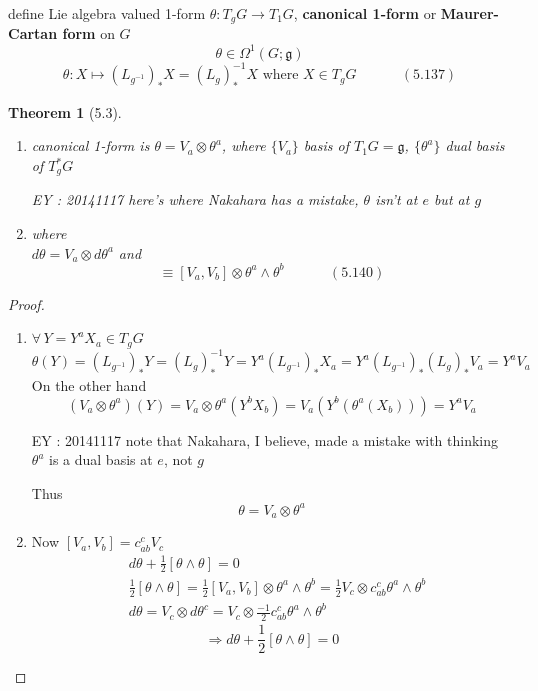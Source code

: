 \documentclass[twoside]{amsart}
\newtheorem{theorem}{Theorem}
\begin{document}
define Lie algebra valued 1-form $\theta: T_gG \to T_1G$, \textbf{canonical 1-form} or \textbf{Maurer-Cartan form} on $G$ \\
\[
\theta \in \Omega^1(G;\mathfrak{g})
\]
\begin{equation}
  \theta : X \mapsto (L_{g^{-1}})_* X = (L_g)^{-1}_* X \text{ where } X \in T_gG \quad \quad \quad \, (5.137)
\end{equation}

\begin{theorem}[5.3] 
\begin{enumerate}
\item[(a)] canonical 1-form is $\theta = V_a \otimes \theta^a$, where $\lbrace V_a \rbrace$ basis of $T_1G = \mathfrak{g}$, $\lbrace \theta^a \rbrace$ dual basis of $T^*_gG$

EY : 20141117 here's where Nakahara has a mistake, $\theta$ isn't at $e$ but at $g$
\item[(b)] where \\
$d\theta = V_a\otimes d\theta^a$ and 
\begin{equation}
  [ \theta \wedge \theta ] \equiv [ V_{a} , V_{b} ] \otimes \theta^{a} \wedge \theta^{b} \quad \quad \quad \, (5.140)
\end{equation}
\end{enumerate}
\end{theorem}

\begin{proof}
  \begin{enumerate}
\item[(a)] $\forall \, Y = Y^a X_a \in T_gG$
\[
\theta(Y) = (L_{g^{-1}})_* Y = (L_g)^{-1}_* Y = Y^a(L_{g^{-1}})_* X_a = Y^a (L_{g^{-1}})_* (L_g)_* V_a = Y^a V_a
\]
On the other hand
\[
(V_a \otimes \theta^a)(Y) = V_a \otimes \theta^a(Y^b X_b) = V_a (Y^b(\theta^a(X_b))) = Y^a V_a
\]

EY : 20141117 note that Nakahara, I believe, made a mistake with thinking $\theta^a$ is a dual basis at $e$, not $g$

Thus
\[
\boxed{ \theta = V_a \otimes \theta^a }
\]


\item[(b)] Now $[V_a,V_b] = c^c_{ab}V_c$
\[
\begin{aligned}
  & d\theta + \frac{1}{2} [ \theta \wedge \theta ] = 0 \\
  & \frac{1}{2} [ \theta \wedge \theta ] = \frac{1}{2} [V_a,V_b] \otimes \theta^a \wedge \theta^b = \frac{1}{2} V_c \otimes c^c_{ab} \theta^a \wedge \theta^b \\ 
  & d\theta = V_c \otimes d\theta^c = V_c \otimes \frac{-1}{2} c^c_{ab} \theta^a \wedge \theta^b 
\end{aligned}
\]
\[
\Longrightarrow \boxed{ d\theta + \frac{1}{2} [ \theta \wedge \theta ] = 0  }
\]
\end{enumerate}
\end{proof}
\end{document}
